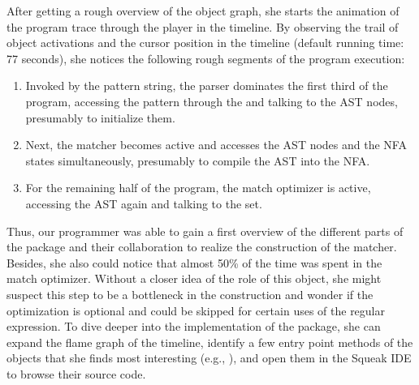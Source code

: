 After getting a rough overview of the object graph, she starts the animation of the program trace through the player in the timeline.
By observing the trail of object activations and the cursor position in the timeline (default running time: 77 seconds), she notices the following rough segments of the program execution:

\begin{enumerate}
	\item Invoked by the pattern string, the parser dominates the first third of the program, accessing the pattern through the  and talking to the AST nodes, presumably to initialize them.
	\item Next, the matcher becomes active and accesses the AST nodes and the NFA states simultaneously, presumably to compile the AST into the NFA.
	\item For the remaining half of the program, the match optimizer is active, accessing the AST again and talking to the set.
\end{enumerate}

Thus, our programmer was able to gain a first overview of the different parts of the  package and their collaboration to realize the construction of the matcher.
Besides, she also could notice that almost 50\si{\percent} of the time was spent in the match optimizer.
Without a closer idea of the role of this object, she might suspect this step to be a bottleneck in the construction and wonder if the optimization is optional and could be skipped for certain uses of the regular expression.
To dive deeper into the implementation of the  package, she can expand the flame graph of the timeline, identify a few entry point methods of the objects that she finds most interesting (e.g., ), and open them in the Squeak IDE to browse their source code.
